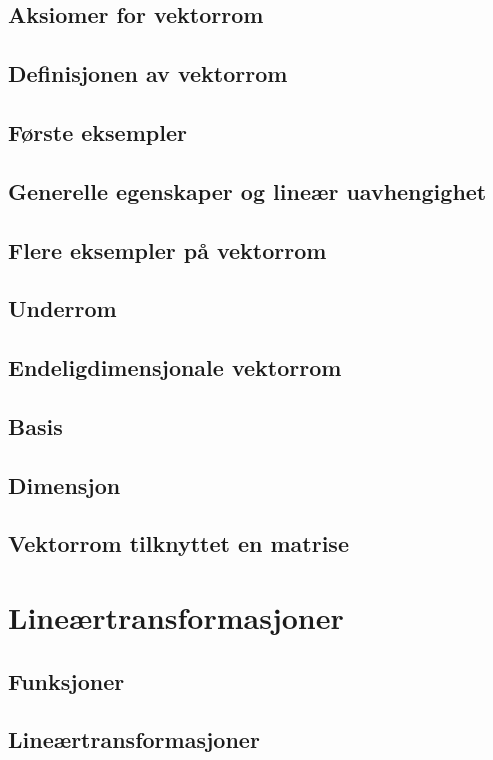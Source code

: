 \documentclass{article}
\begin{document}
\subsection{Aksiomer for vektorrom}
\subsection{Definisjonen av vektorrom}
\subsection{Første eksempler}
\subsection{Generelle egenskaper og lineær uavhengighet}
\subsection{Flere eksempler på vektorrom}
\subsection{Underrom}
\subsection{Endeligdimensjonale vektorrom}
\subsection{Basis}
\subsection{Dimensjon}
\subsection{Vektorrom tilknyttet en matrise}


\section{Lineærtransformasjoner}

\subsection{Funksjoner}
\subsection{Lineærtransformasjoner}
\end{document}
